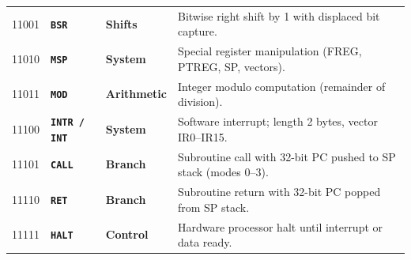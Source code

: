 \documentclass[11pt,a4paper]{article}
\begin{document}
\begin{tabularx}{\textwidth}{@{}c l l >{\raggedright\arraybackslash}X@{}}
11001 & \texttt{\textbf{BSR}}        & \textcolor{limorangeaccent}{\textbf{Shifts}}     & Bitwise right shift by 1 with displaced bit capture. \\
11010 & \texttt{\textbf{MSP}}        & \textcolor{limmuted}{\textbf{System}}      & Special register manipulation (FREG, PTREG, SP, vectors). \\
11011 & \texttt{\textbf{MOD}}        & \textcolor{limorangeaccent}{\textbf{Arithmetic}} & Integer modulo computation (remainder of division). \\
11100 & \texttt{\textbf{INTR / INT}} & \textcolor{limmuted}{\textbf{System}}      & Software interrupt; length 2 bytes, vector IR0--IR15. \\
11101 & \texttt{\textbf{CALL}}       & \textcolor{limdark}{\textbf{Branch}}       & Subroutine call with 32-bit PC pushed to SP stack (modes 0--3). \\
11110 & \texttt{\textbf{RET}}        & \textcolor{limdark}{\textbf{Branch}}       & Subroutine return with 32-bit PC popped from SP stack. \\
11111 & \texttt{\textbf{HALT}}       & \textcolor{limmuted}{\textbf{Control}}     & Hardware processor halt until interrupt or data ready. \\
\bottomrule
\end{tabularx}
\normalsize
\end{document}
